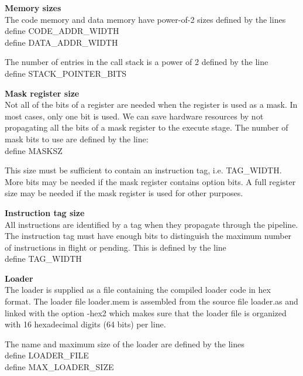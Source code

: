 \documentclass[11pt,a4paper,oneside,openright]{report}
\newcommand{\vv}{ \vspace{2mm} }   %
\begin{document}
\textbf{Memory sizes} \\
The code memory and data memory have power-of-2 sizes defined by the lines \\
\hspace{10mm} \textasciigrave define CODE\_ADDR\_WIDTH \\
\hspace{10mm} \textasciigrave define DATA\_ADDR\_WIDTH \\
\vv 

The number of entries in the call stack is a power of 2 defined by the line \\
\hspace{10mm} \textasciigrave define STACK\_POINTER\_BITS \\
\vv 
\vv


\textbf{Mask register size} \\
Not all of the bits of a register are needed when the register is used as a mask. In most cases, only one bit is used. We can save hardware resources by not propagating all the bits of a mask register to the execute stage. The number of mask bits to use are defined by the line: \\
\hspace{10mm} \textasciigrave define MASKSZ \\
\vv

This size must be sufficient to contain an instruction tag, i.e. TAG\_WIDTH. More bits may be needed if the mask register contains option bits. A full register size may be needed if the mask register is used for other purposes.
\vv
\vv


\textbf{Instruction tag size} \\
All instructions are identified by a tag when they propagate through the pipeline. The instruction tag must have enough bits to distinguish the maximum number of instructions in flight or pending. This is defined by the line \\
\hspace{10mm} \textasciigrave define TAG\_WIDTH \\
\vv
\vv


\textbf{Loader} \\
The loader is supplied as a file containing the compiled loader code in hex format. The loader file loader.mem is assembled from the source file loader.as and linked with the option -hex2 which makes sure that the loader file is organized with 16 hexadecimal digits (64 bits) per line. 
\vv

The name and maximum size of the loader are defined by the lines \\
\hspace{10mm} \textasciigrave define LOADER\_FILE \\
\hspace{10mm} \textasciigrave define MAX\_LOADER\_SIZE \\
\vv
\end{document}
